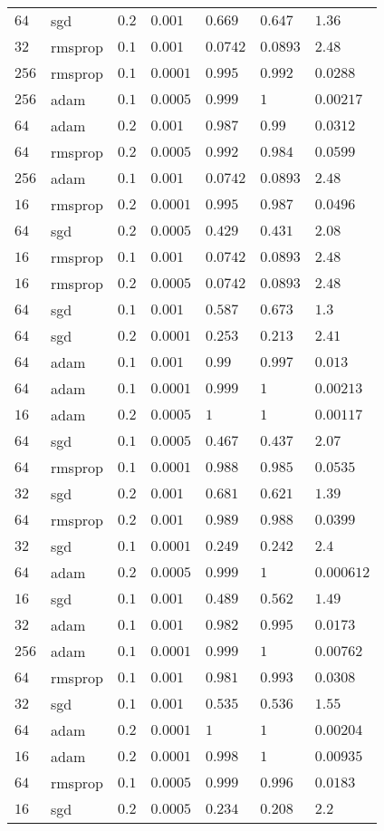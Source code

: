 \begin{table}[tbp]
\begin{tabular}{lllllll}
$64$ & sgd & $0.2$ & $0.001$ & $0.669$ & $0.647$ & $1.36$ \\
$32$ & rmsprop & $0.1$ & $0.001$ & $0.0742$ & $0.0893$ & $2.48$ \\
$256$ & rmsprop & $0.1$ & $0.0001$ & $0.995$ & $0.992$ & $0.0288$ \\
$256$ & adam & $0.1$ & $0.0005$ & $0.999$ & $1$ & $0.00217$ \\
$64$ & adam & $0.2$ & $0.001$ & $0.987$ & $0.99$ & $0.0312$ \\
$64$ & rmsprop & $0.2$ & $0.0005$ & $0.992$ & $0.984$ & $0.0599$ \\
$256$ & adam & $0.1$ & $0.001$ & $0.0742$ & $0.0893$ & $2.48$ \\
$16$ & rmsprop & $0.2$ & $0.0001$ & $0.995$ & $0.987$ & $0.0496$ \\
$64$ & sgd & $0.2$ & $0.0005$ & $0.429$ & $0.431$ & $2.08$ \\
$16$ & rmsprop & $0.1$ & $0.001$ & $0.0742$ & $0.0893$ & $2.48$ \\
$16$ & rmsprop & $0.2$ & $0.0005$ & $0.0742$ & $0.0893$ & $2.48$ \\
$64$ & sgd & $0.1$ & $0.001$ & $0.587$ & $0.673$ & $1.3$ \\
$64$ & sgd & $0.2$ & $0.0001$ & $0.253$ & $0.213$ & $2.41$ \\
$64$ & adam & $0.1$ & $0.001$ & $0.99$ & $0.997$ & $0.013$ \\
$64$ & adam & $0.1$ & $0.0001$ & $0.999$ & $1$ & $0.00213$ \\
$16$ & adam & $0.2$ & $0.0005$ & $1$ & $1$ & $0.00117$ \\
$64$ & sgd & $0.1$ & $0.0005$ & $0.467$ & $0.437$ & $2.07$ \\
$64$ & rmsprop & $0.1$ & $0.0001$ & $0.988$ & $0.985$ & $0.0535$ \\
$32$ & sgd & $0.2$ & $0.001$ & $0.681$ & $0.621$ & $1.39$ \\
$64$ & rmsprop & $0.2$ & $0.001$ & $0.989$ & $0.988$ & $0.0399$ \\
$32$ & sgd & $0.1$ & $0.0001$ & $0.249$ & $0.242$ & $2.4$ \\
$64$ & adam & $0.2$ & $0.0005$ & $0.999$ & $1$ & $0.000612$ \\
$16$ & sgd & $0.1$ & $0.001$ & $0.489$ & $0.562$ & $1.49$ \\
$32$ & adam & $0.1$ & $0.001$ & $0.982$ & $0.995$ & $0.0173$ \\
$256$ & adam & $0.1$ & $0.0001$ & $0.999$ & $1$ & $0.00762$ \\
$64$ & rmsprop & $0.1$ & $0.001$ & $0.981$ & $0.993$ & $0.0308$ \\
$32$ & sgd & $0.1$ & $0.001$ & $0.535$ & $0.536$ & $1.55$ \\
$64$ & adam & $0.2$ & $0.0001$ & $1$ & $1$ & $0.00204$ \\
$16$ & adam & $0.2$ & $0.0001$ & $0.998$ & $1$ & $0.00935$ \\
$64$ & rmsprop & $0.1$ & $0.0005$ & $0.999$ & $0.996$ & $0.0183$ \\
$16$ & sgd & $0.2$ & $0.0005$ & $0.234$ & $0.208$ & $2.2$ \\
\hline
\end{tabular}
\end{table}
